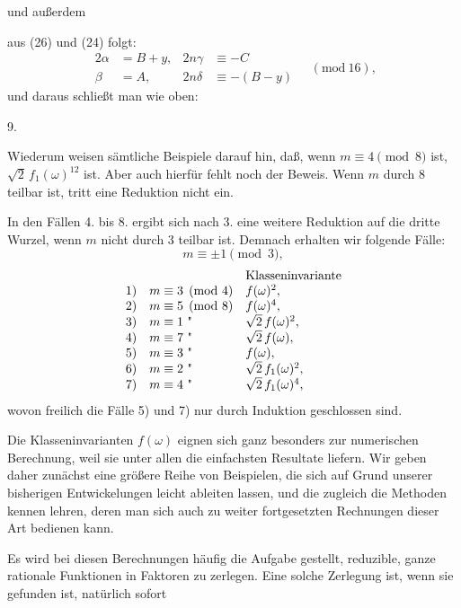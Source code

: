 
und außerdem


aus (26) und (24) folgt:
\[
\begin{aligned}
2\alpha &= B+y, & 2n\gamma &\equiv -C\\
\beta &= A, & 2n\delta &\equiv -(B-y)
\end{aligned}
\quad (\mathrm{mod}\ 16),
\]
und daraus schließt man wie oben:

9. 

Wiederum weisen sämtliche Beispiele darauf hin, daß, wenn
$m \equiv 4 \pmod{8}$ ist, $\sqrt{2}\,f_1(\omega)^{12}$  ist. Aber
auch hierfür fehlt noch der Beweis. Wenn $m$ durch 8 teilbar
ist, tritt eine Reduktion nicht ein.

In den Fällen 4. bis 8. ergibt sich nach 3. eine weitere
Reduktion auf die dritte Wurzel, wenn $m$ nicht durch 3 teilbar
ist. Demnach erhalten wir folgende Fälle:
\[
m \equiv \pm 1 \pmod{3},
\]
\[
\begin{array}{lll}
 & & \text{Klasseninvariante}\\
1) & m \equiv 3 \pmod{4} & f(\omega)^2,\\
2) & m \equiv 5 \pmod{8} & f(\omega)^4,\\
3) & m \equiv 1 \ \text{\textquotedbl} & \sqrt{2}\,f(\omega)^2,\\
4) & m \equiv 7 \ \text{\textquotedbl} & \sqrt{2}\,f(\omega),\\
5) & m \equiv 3 \ \text{\textquotedbl} & f(\omega),\\
6) & m \equiv 2 \ \text{\textquotedbl} & \sqrt{2}\,f_1(\omega)^2,\\
7) & m \equiv 4 \ \text{\textquotedbl} & \sqrt{2}\,f_1(\omega)^4,
\end{array}
\]
wovon freilich die Fälle 5) und 7) nur durch Induktion geschlossen
 sind.

Die Klasseninvarianten $f(\omega)$ eignen sich ganz besonders zur
numerischen Berechnung, weil sie unter allen die einfachsten
Resultate liefern. Wir geben daher zunächst eine größere Reihe
von Beispielen, die sich auf Grund unserer bisherigen Entwickelungen leicht ableiten lassen, und die zugleich die Methoden
kennen lehren, deren man sich auch zu weiter fortgesetzten Rechnungen dieser Art bedienen kann.

Es wird bei diesen Berechnungen häufig die Aufgabe gestellt,
reduzible, ganze rationale Funktionen in Faktoren zu zerlegen.
Eine solche Zerlegung ist, wenn sie gefunden ist, natürlich sofort
